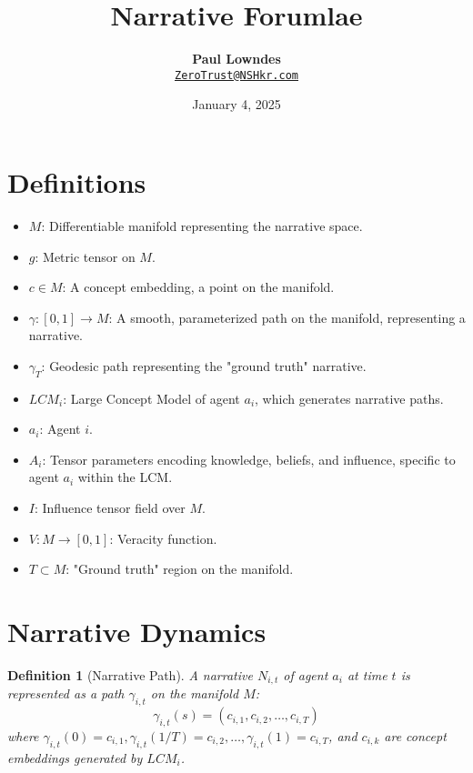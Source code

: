 \documentclass[12pt, a4paper]{article}
\title{\vspace{-2cm}\textbf{Narrative Forumlae}}
\author{\textbf{Paul Lowndes} \\ \href{mailto:ZeroTrust@NSHkr.com}{\texttt{ZeroTrust@NSHkr.com}}}
\date{\small January 4, 2025}
\newtheorem{definition}{Definition}
\begin{document}
\maketitle
\vspace{-1.5em}

\begin{abstract}

\end{abstract}


\section{Definitions}

\begin{itemize}
    \item \( M \): Differentiable manifold representing the narrative space.
    \item \( g \): Metric tensor on \( M \).
    \item \( c \in M \): A concept embedding, a point on the manifold.
    \item \( \gamma: [0,1] \rightarrow M \): A smooth, parameterized path on the manifold, representing a narrative.
    \item \( \gamma_T \): Geodesic path representing the "ground truth" narrative.
    \item \( LCM_i \): Large Concept Model of agent \( a_i \), which generates narrative paths.
	\item \( a_i \): Agent \( i \).
    \item \( A_i \): Tensor parameters encoding knowledge, beliefs, and influence, specific to agent \( a_i \) within the LCM.
	\item \( I \): Influence tensor field over \( M \).
    \item \( V: M \rightarrow [0, 1] \): Veracity function.
    \item \( T \subset M \): "Ground truth" region on the manifold.
	
\end{itemize}

\section{Narrative Dynamics}

\begin{definition}[Narrative Path]
A narrative \( N_{i,t} \) of agent \( a_i \) at time \( t \) is represented as a path \( \gamma_{i,t} \) on the manifold \( M \):
\begin{equation}
    \gamma_{i,t}(s) = (c_{i,1}, c_{i,2}, \dots, c_{i,T})
\end{equation}
where \( \gamma_{i,t}(0) = c_{i,1}, \gamma_{i,t}(1/T) = c_{i,2}, \dots, \gamma_{i,t}(1) = c_{i,T} \), and \( c_{i,k} \) are concept embeddings generated by \( LCM_i \).
\end{definition}
\end{document}
